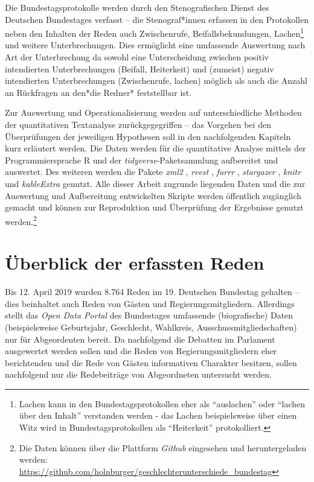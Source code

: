 \documentclass[12pt, 
    twoside=false, 
    bibliography=totoc, 
    numbers=endperiod, 
    headings=normal, 
    toc=chapterentrydotfill
    ]{scrbook}
\begin{document}
Die Bundestagsprotokolle werden durch den Stenografischen Dienst des Deutschen Bundestages verfasst -- die Stenograf*innen erfassen in den Protokollen neben den Inhalten der Reden auch Zwischenrufe, Beifallsbekundungen, Lachen\footnote{Lachen kann in den Bundestagsprotokollen eher als \enquote{auslachen} oder \enquote{lachen über den Inhalt} verstanden werden - das Lachen beispielsweise über einen Witz wird in Bundestagsprotokollen als \enquote{Heiterkeit} protokolliert.} und weitere Unterbrechungen. Dies ermöglicht eine umfassende Auswertung nach Art der Unterbrechung da sowohl eine Unterscheidung zwischen positiv intendierten Unterbrechungen (Beifall, Heiterkeit) und (zumeist) negativ intendierten Unterbrechungen (Zwischenrufe, lachen) möglich als auch die Anzahl an Rückfragen an den*die Redner* feststellbar ist.

Zur Auswertung und Operationalisierung werden auf unterschiedliche Methoden der quantitativen Textanalyse zurückgegegriffen -- das Vorgehen bei den Überprüfungen der jeweiligen Hypothesen soll in den nachfolgenden Kapiteln kurz erläutert werden. Die Daten werden für die quantitative Analyse mittels der Programmiersprache R \parencite{rcoreteam_2018} und der \emph{tidyverse}-Paketsammlung \parencite{wickham_2017} aufbereitet und auswertet. Des weiteren werden die Pakete \emph{xml2} \parencite{wickham_2018}, \emph{rvest} \parencite{wickham_2016}, \emph{furrr} \parencite{vaughan_2018}, \emph{stargazer} \parencite{hlavac_2018}, \emph{knitr} \parencite{xie_2014} und \emph{kableExtra} \parencite{zhu_2019} genutzt. 
Alle dieser Arbeit zugrunde liegenden Daten und die zur Auswertung und Aufbereitung entwickelten Skripte werden öffentlich zugänglich gemacht und können zur Reproduktion und Überprüfung der Ergebnisse genutzt werden.\footnote{Die Daten können über die Plattform \emph{Github} eingesehen und heruntergeladen werden: \url{https://github.com/holnburger/geschlechterunterschiede_bundestag}}

\section{Überblick der erfassten Reden}\label{kapitel:ueberblick_reden}

Bis 12. April 2019 wurden 8.764 Reden im 19. Deutschen Bundestag gehalten -- dies beinhaltet auch Reden von Gästen und Regierungsmitgliedern. Allerdings stellt das \emph{Open Data Portal} des Bundestages umfassende (biografische) Daten (beispielsweise Geburtsjahr, Geschlecht, Wahlkreis, Ausschussmitgliedschaften) nur für Abgeordenten bereit. Da nachfolgend die Debatten im Parlament ausgewertet werden sollen und die Reden von Regierungsmitgliedern eher berichtenden und die Rede von Gästen informativen Charakter besitzen, sollen nachfolgend nur die Redebeiträge von Abgeordneten untersucht werden.
\end{document}

